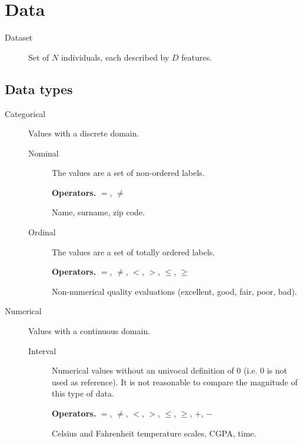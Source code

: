 \section{Data}

\begin{description}
    \item[Dataset] 
        Set of $N$ individuals, each described by $D$ features. 
\end{description}


\subsection{Data types}

\begin{description}
    \item[Categorical] Values with a discrete domain.
        \begin{description}
            \item[Nominal] 
                The values are a set of non-ordered labels.

                \textbf{Operators.} $=$, $\neq$
                \begin{example}
                    Name, surname, zip code.
                \end{example}

            \item[Ordinal] 
                The values are a set of totally ordered labels.

                \textbf{Operators.} $=$, $\neq$, $<$, $>$, $\leq$, $\geq$
                \begin{example}
                    Non-numerical quality evaluations (excellent, good, fair, poor, bad).
                \end{example}
        \end{description}

    \item[Numerical] Values with a continuous domain.
        \begin{description}
            \item[Interval] 
                Numerical values without an univocal definition of 0 (i.e. 0 is not used as reference).
                It is not reasonable to compare the magnitude of this type of data.

                \textbf{Operators.} $=$, $\neq$, $<$, $>$, $\leq$, $\geq$, $+$, $-$
                \begin{example}
                    Celsius and Fahrenheit temperature scales, CGPA, time.
                    

\end{example}
\end{description}
\end{description}
